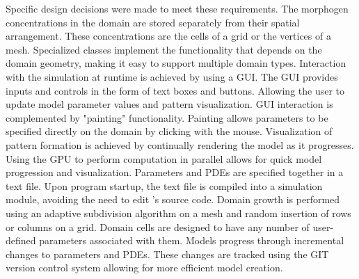 Specific design decisions were made to meet these requirements. The morphogen concentrations in the domain are stored separately from their spatial arrangement. These concentrations are the cells of a grid or the vertices of a mesh. Specialized classes implement the functionality that depends on the domain geometry, making it easy to support multiple domain types.
Interaction with the simulation at runtime is achieved by using a GUI. The GUI provides inputs and controls in the form of text boxes and buttons. Allowing the user to update model parameter values and pattern visualization. GUI interaction is complemented by "painting" functionality. Painting allows parameters to be specified directly on the domain by clicking with the mouse.
Visualization of pattern formation is achieved by continually rendering the model as it progresses. Using the GPU to perform computation in parallel allows for quick model progression and visualization.
Parameters and PDEs are specified together in a text file. Upon program startup, the text file is compiled into a simulation module, avoiding the need to edit \ProgramName{}'s source code.
Domain growth is performed using an adaptive subdivision algorithm on a mesh and random insertion of rows or columns on a grid. Domain cells are designed to have any number of user-defined parameters associated with them. 
Models progress through incremental changes to parameters and PDEs. These changes are tracked using the GIT version control system allowing for more efficient model creation.

